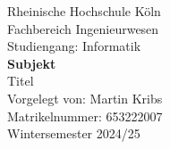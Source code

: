 \begin{titlepage}
    \centering
    
    {\huge Rheinische Hochschule Köln}\\[0.5cm]
    {\Large Fachbereich Ingenieurwesen}\\
    {\normalsize Studiengang: Informatik}\\[1cm]
    
    {\Large\textbf{Subjekt}}\\[1cm]
    
    {\Large Titel}\\[2cm]
    
    \normalsize
    Vorgelegt von: Martin Kribs \\
    Matrikelnummer: 653222007\\[2cm]
    
    Wintersemester 2024/25

    \vfill
    
\end{titlepage}
